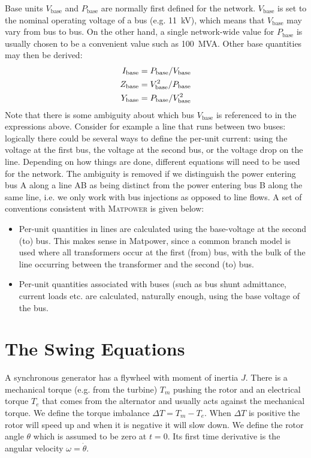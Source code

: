 \documentclass[10pt]{article}
\begin{document}
Base units $V_\text{base}$ and $P_\text{base}$ are normally first defined for the network. $V_\text{base}$ is set to the nominal operating voltage of a bus (e.g. 11~kV), which means that $V_\text{base}$ may vary from bus to bus. On the other hand, a single network-wide value for $P_\text{base}$ is usually chosen to be a convenient value such as 100~MVA. Other base quantities may then be derived:
\begin{align}
	I_\text{base} &= P_\text{base}/V_\text{base} \notag \\
	Z_\text{base} &= V_\text{base}^2 / P_\text{base} \notag \\
	Y_\text{base} &= P_\text{base} / V_\text{base}^2
\end{align}
Note that there is some ambiguity about which bus $V_\text{base}$ is referenced to in the expressions above. Consider for example a line that runs between two buses: logically there could be several ways to define the per-unit current: using the voltage at the first bus, the voltage at the second bus, or the voltage drop on the line. Depending on how things are done, different equations will need to be used for the network. The ambiguity is removed if we distinguish the power entering bus A along a line AB as being distinct from the power entering bus B along the same line, i.e. we only work with bus injections as opposed to line flows. A set of conventions consistent with \textsc{Matpower} is given below:
\begin{itemize}
\item Per-unit quantities in lines are calculated using the base-voltage at the second (to) bus. This makes sense in Matpower, since a common branch model is used where all transformers occur at the first (from) bus, with the bulk of the line occurring between the transformer and the second (to) bus.
\item Per-unit quantities associated with buses (such as bus shunt admittance, current loads etc. are calculated, naturally enough, using the base voltage of the bus.
\end{itemize}

\section{The Swing Equations}
A synchronous generator has a flywheel with moment of inertia $J$. There is a mechanical torque (e.g. from the turbine) $T_m$ pushing the rotor and an electrical torque $T_e$ that comes from the alternator and usually acts against the mechanical torque. We define the torque imbalance $\Delta T = T_m - T_e$. When $\Delta T$ is positive the rotor will speed up and when it is negative it will slow down. We define the rotor angle $\theta$ which is assumed to be zero at $t = 0$. Its first time derivative is the angular velocity $\omega = \dot{\theta}$.
\end{document}

